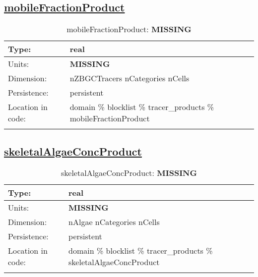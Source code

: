 \subsection[mobileFractionProduct]{\hyperref[sec:var_tab_tracer_products]{mobileFractionProduct}}
\label{subsec:var_sec_tracer_products_mobileFractionProduct}
\begin{center}
\begin{longtable}{| p{2.0in} | p{4.0in} |}
        \hline 
        Type: & real \\
        \hline 
        Units: & {\bf \color{red} MISSING} \\
        \hline 
        Dimension: & nZBGCTracers nCategories nCells \\
        \hline 
        Persistence: & persistent \\
        \hline 
         Location in code: & domain \% blocklist \% tracer\_products \% mobileFractionProduct \\
         \hline 
    \caption{mobileFractionProduct: {\bf \color{red} MISSING}}
\end{longtable}
\end{center}
\subsection[skeletalAlgaeConcProduct]{\hyperref[sec:var_tab_tracer_products]{skeletalAlgaeConcProduct}}
\label{subsec:var_sec_tracer_products_skeletalAlgaeConcProduct}
\begin{center}
\begin{longtable}{| p{2.0in} | p{4.0in} |}
        \hline 
        Type: & real \\
        \hline 
        Units: & {\bf \color{red} MISSING} \\
        \hline 
        Dimension: & nAlgae nCategories nCells \\
        \hline 
        Persistence: & persistent \\
        \hline 
         Location in code: & domain \% blocklist \% tracer\_products \% skeletalAlgaeConcProduct \\
         \hline 
    \caption{skeletalAlgaeConcProduct: {\bf \color{red} MISSING}}
\end{longtable}
\end{center}
